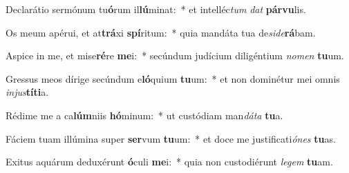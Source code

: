 \item Declarátio sermónum tu\textbf{ó}rum il\textbf{lú}minat:~* et intelléc\textit{tum} \textit{dat} \textbf{pár}\textbf{vu}lis.
\item Os meum apérui, et at\textbf{trá}xi \textbf{spí}ritum:~* quia mandáta tua de\textit{si}\textit{de}\textbf{rá}bam.
\item Aspice in me, et mise\textbf{ré}re \textbf{me}i:~* secúndum judícium diligéntium \textit{no}\textit{men} \textbf{tu}um.
\item Gressus meos dírige secúndum e\textbf{ló}quium \textbf{tu}um:~* et non dominétur mei omnis \textit{in}\textit{jus}\textbf{tí}\textbf{ti}a.
\item Rédime me a ca\textbf{lúm}niis \textbf{hó}minum:~* ut custódiam man\textit{dá}\textit{ta} \textbf{tu}a.
\item Fáciem tuam illúmina super \textbf{ser}vum \textbf{tu}um:~* et doce me justificati\textit{ó}\textit{nes} \textbf{tu}as.
\item Exitus aquárum deduxérunt \textbf{ó}culi \textbf{me}i:~* quia non custodiérunt \textit{le}\textit{gem} \textbf{tu}am.
